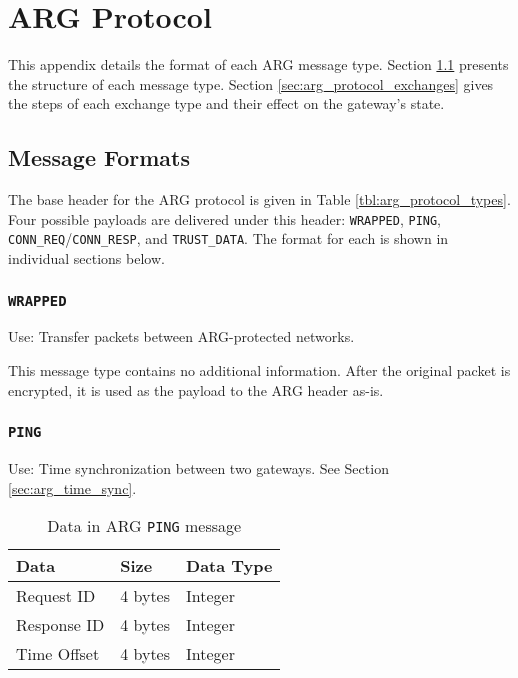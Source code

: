 \chapter{\ac{ARG} Protocol}
\label{chp:protocol}
\par This appendix details the format of each \ac{ARG} message type. Section \ref{sec:arg_protocol_formats} presents the structure of each message type. Section \ref{sec:arg_protocol_exchanges} gives the steps of each exchange type and their effect on the gateway's state.

\section{Message Formats}
\label{sec:arg_protocol_formats}
\par The base header for the \ac{ARG} protocol is given in Table \ref{tbl:arg_protocol_types}. Four possible payloads are delivered under this header: \texttt{WRAPPED}, \texttt{PING}, \texttt{CONN\_REQ}/\texttt{CONN\_RESP}, and \texttt{TRUST\_DATA}. The format for each is shown in individual sections below.

\subsection{\texttt{WRAPPED}}
\par Use: Transfer packets between \ac{ARG}-protected networks.

\par This message type contains no additional information. After the original packet is encrypted, it is used as the payload to the \ac{ARG} header as-is.

\subsection{\texttt{PING}}
\par Use: Time synchronization between two gateways. See Section \ref{sec:arg_time_sync}.

\begin{table}[H]
\caption{Data in \ac{ARG} \texttt{PING} message}
\label{tbl:arg_ping_struct}
\centering
\begin{tabular}{l|l|l}
\textbf{Data} & \textbf{Size} & \textbf{Data Type}\\
\hline
Request ID & 4 bytes & Integer\\
Response ID & 4 bytes & Integer\\
Time Offset & 4 bytes & Integer
\end{tabular}
\end{table}

